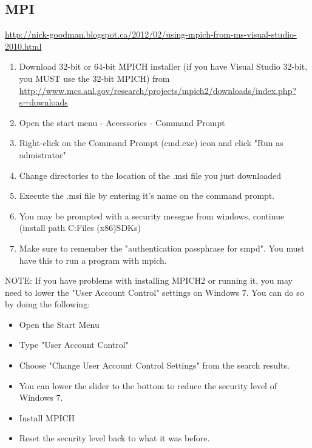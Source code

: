  \subsection{MPI}
 \url{http://nick-goodman.blogspot.ca/2012/02/using-mpich-from-ms-visual-studio-2010.html}
 \begin{enumerate}
\item Download 32-bit or 64-bit MPICH installer (if you have Visual Studio 32-bit, you MUST use the 32-bit MPICH) from \url{http://www.mcs.anl.gov/research/projects/mpich2/downloads/index.php?s=downloads}
\item  Open the start menu - Accessories - Command Prompt
\item Right-click on the Command Prompt (cmd.exe) icon and click "Run as admistrator"
\item Change directories to the location of the .msi file you just downloaded
\item Execute the .msi file by entering it's name on the command prompt.
\item You may be prompted with a security messgae from windows, continue (install path C:\Program Files (x86)\Microsoft SDKs)
\item Make sure to remember the "authentication passphrase for smpd".  You must have this to run a program with mpich.
\end{enumerate} 
 NOTE: If you have problems with installing MPICH2 or running it, you may need to lower the "User Account Control" settings on Windows 7.  You can do so by doing the following:
\begin{itemize}\item  Open the Start Menu
\item Type "User Account Control"
\item Choose "Change User Account Control Settings" from the search results.
\item You can lower the slider to the bottom to reduce the security level of Windows 7.
\item Install MPICH
\item Reset the security level back to what it was before. \end{itemize}


